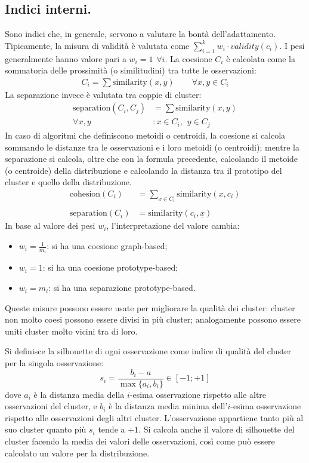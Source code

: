 \documentclass[11pt, a4page, twocolumn]{article}
\begin{document}
\subsection{Indici interni.}
Sono indici che, in generale, servono a valutare la bontà dell'adattamento.
Tipicamente, la misura di validità è valutata come $\sum_{i=1}^{k}{w_i \cdot validity(c_i)}$.
I pesi generalmente hanno valore pari a $w_i = 1 \hspace{5pt} \forall{i}$.
La coesione $C_i$ è calcolata come la sommatoria delle prossimità (o similitudini) tra tutte le osservazioni:
\begin{align*}
  C_i = \sum{\text{similarity}(x, y)} \hspace{25pt} \forall{x, y \in C_i}
\end{align*}
La separazione invece è valutata tra coppie di cluster:
\begin{align*}
  \text{separation}(C_i, C_j) &= \sum{\text{similarity}(x, y)} \\
  \forall x, y &: x \in C_i, \hspace{5pt} y \in C_j
\end{align*}
In caso di algoritmi che definiscono metoidi o centroidi, la coesione si calcola sommando le distanze tra le osservazioni e i loro metoidi (o centroidi); mentre la separazione si calcola, oltre che con la formula precedente, calcolando il metoide (o centroide) della distribuzione e calcolando la distanza tra il prototipo del cluster e quello della distribuzione.
\begin{align*}
  \text{cohesion}(C_i) &= \sum_{x \in C_i}{\text{similarity}(x, c_i)} \\ \\
  \text{separation}(C_i) &= \text{similarity}(c_i, \underline{x})
\end{align*}
In base al valore dei pesi $w_i$, l'interpretazione del valore cambia:
\begin{itemize}
\item $w_i = \frac{1}{m_i}$: si ha una coesione graph-based;
\item $w_i = 1$: si ha una coesione prototype-based;
\item $w_i = m_i$: si ha una separazione prototype-based.
\end{itemize}
Queste misure possono essere usate per migliorare la qualità dei cluster: cluster non molto coesi possono essere divisi in più cluster; analogamente possono essere uniti cluster molto vicini tra di loro.

Si definisce la silhouette di ogni osservazione come indice di qualità del cluster per la singola osservazione:
\begin{equation*}
  s_i = \frac{b_i - a}{\max{\{a_i, b_i\}}} \in [-1; +1]
\end{equation*}
dove $a_i$ è la distanza media della $i$-esima osservazione rispetto alle altre osservazioni del cluster, e $b_i$ è la distanza media minima dell'$i$-esima osservazione rispetto alle osservazioni degli altri cluster.
L'osservazione appartiene tanto più al suo cluster quanto più $s_i$ tende a $+1$.
Si calcola anche il valore di silhouette del cluster facendo la media dei valori delle osservazioni, così come può essere calcolato un valore per la distribuzione.
\end{document}
